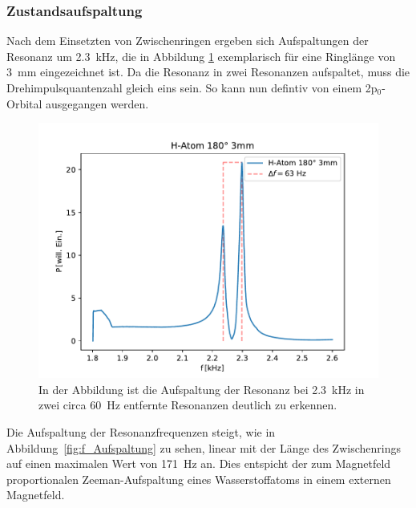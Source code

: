         \newpage
        \FloatBarrier
        \subsubsection*{Zustandsaufspaltung}
            Nach dem Einsetzten von Zwischenringen ergeben sich Aufspaltungen der Resonanz um \SI{2.3}{\kilo\hertz}, die in Abbildung \ref{fig:hatom_180_3mm} exemplarisch für eine Ringlänge von 
            \SI{3}{\milli\metre} eingezeichnet ist. Da die Resonanz in zwei Resonanzen aufspaltet, muss die Drehimpulsquantenzahl gleich eins sein. So kann nun defintiv von einem 2p$_0$-Orbital
            ausgegangen werden.
            \FloatBarrier 
            \begin{figure}[ht]
                \centering
                \includegraphics[scale=0.5]{./pictures/hatom_180_3mm.pdf}
                \caption{In der Abbildung ist die Aufspaltung der Resonanz bei \SI{2.3}{\kilo\hertz} in zwei circa \SI{60}{\hertz} entfernte Resonanzen deutlich zu erkennen.}
                \label{fig:hatom_180_3mm}
            \end{figure}
            \FloatBarrier
            Die Aufspaltung der Resonanzfrequenzen steigt, wie in Abbildung~\ref{fig:f_Aufspaltung} zu sehen, linear mit der Länge des Zwischenrings auf einen maximalen Wert von \SI{171}{\hertz} an.
            Dies entspicht der zum Magnetfeld proportionalen Zeeman-Aufspaltung eines Wasserstoffatoms in einem externen Magnetfeld.
            \FloatBarrier
